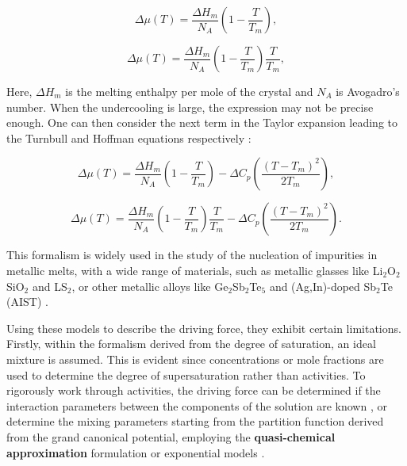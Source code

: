 \begin{equation}
    \Delta\mu(T) =  \frac{\Delta H_{m}}{N_A} \left( 1 - \frac{T}{T_{m}} \right),
\end{equation}

\begin{equation}
    \Delta\mu(T) = \frac{\Delta H_{m}}{N_A} \left( 1 - \frac{T}{T_{m}} \right) \frac{T}{T_{m}},
\end{equation}

Here, \(\Delta H_{m}\) is the melting enthalpy per mole of the crystal and \(N_A\) is Avogadro's number. When the undercooling is large, the expression may not be precise enough. One can then consider the next term in the Taylor expansion leading to the Turnbull and Hoffman equations respectively \cite{Clouet1}:

\begin{equation}
    \Delta\mu(T) = \frac{\Delta H_{m}}{N_A} \left( 1 - \frac{T}{T_{m}} \right)  - \Delta C_{p} \left( \frac{(T - T_{m})^2}{2T_{m}} \right),
\end{equation}

\begin{equation}
    \Delta\mu(T) =  \frac{\Delta H_{m}}{N_A} \left( 1 - \frac{T}{T_{m}} \right) \frac{T}{T_{m}}   - \Delta C_{p} \left( \frac{(T - T_{m})^2}{2T_{m}} \right).
\end{equation}

This formalism is widely used in the study of the nucleation of impurities in metallic melts, with a wide range of materials, such as metallic glasses like Li\(_2\)O\(_2\)SiO\(_2\) and LS\(_2\), or other metallic alloys like Ge\(_2\)Sb\(_2\)Te\(_5\) and (Ag,In)-doped Sb\(_2\)Te (AIST) \cite{Laszlo1, Neilson1979, Kelton1983, Laszlo3, Laszlo4, Sun2009}.

Using these models to describe the driving force, they exhibit certain limitations. Firstly, within the formalism derived from the degree of saturation, an ideal mixture is assumed. This is evident since concentrations or mole fractions are used to determine the degree of supersaturation rather than activities. To rigorously work through activities, the driving force can be determined if the interaction parameters between the components of the solution are known \cite{Bartels1991}, or determine the mixing parameters starting from the partition function derived from the grand canonical potential, employing the \textbf{quasi-chemical approximation} formulation \cite{Odusote2020} or exponential models \cite{Yadav2023}.

